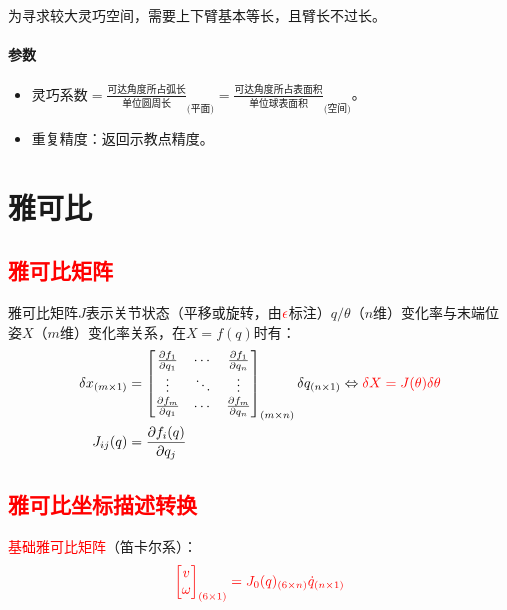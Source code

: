 \documentclass[
12pt, %
a4paper, 
oneside, %
]{scrartcl}
\begin{document}
为寻求较大灵巧空间，需要上下臂基本等长，且臂长不过长。
\paragraph{参数}
\begin{itemize}
\item $ \text{灵巧系数} = \frac{\text{可达角度所占弧长}}{\text{单位圆周长}}_{\text{(平面)}} = \frac{\text{可达角度所占表面积}}{\text{单位球表面积}}_{\text{(空间)}} $。
\item 重复精度：返回示教点精度。
\end{itemize} 
\section{雅可比}
\subsection[雅可比矩阵]{\textcolor{red}{雅可比矩阵}}
雅可比矩阵$ J $表示关节状态（平移或旋转，由$ \textcolor{red}{\epsilon} $标注）$ q/\theta $（$ n $维）变化率与末端位姿$ X $（$ m $维）变化率关系，在$ X = f(q) $时有：
\begin{align*}
\delta x_{(m \times 1)} &= \begin{bmatrix} \frac{\partial f_1}{\partial q_1} & \cdots & \frac{\partial f_1}{\partial q_n} \\ \vdots & \ddots & \vdots \\ \frac{\partial f_m}{\partial q_1} & \cdots & \frac{\partial f_m}{\partial q_n} \end{bmatrix}_{(m \times n)} \delta q_{(n \times 1)} \Leftrightarrow \textcolor{red}{\delta X = J(\theta) \delta \theta} \\
J_{ij}(q) &= \frac{\partial f_i(q)}{\partial q_j}
\end{align*}
\subsection[雅可比坐标描述转换]{\textcolor{red}{雅可比坐标描述转换}}
\textcolor{red}{基础雅可比矩阵}（笛卡尔系）：
$$ \textcolor{red}{\begin{bmatrix} v \\ \omega \end{bmatrix}_{(6 \times 1)} = J_0(q)_{(6 \times n)} \dot{q}_{(n \times 1)}} $$
\end{document}
